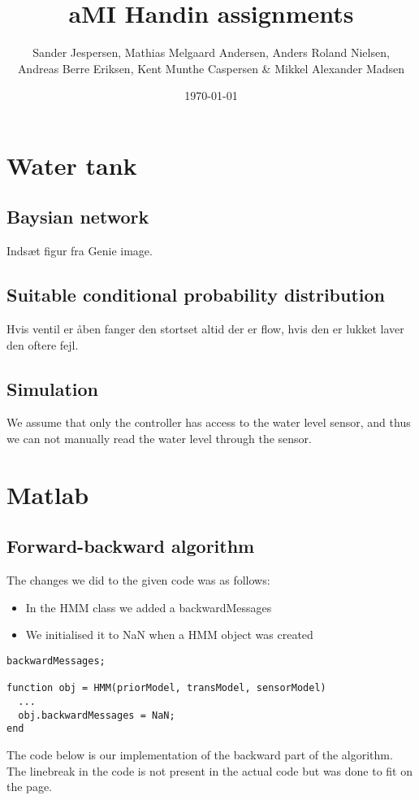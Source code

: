\documentclass[colorlinks=true,linkcolor=blue]{article}
\author{Sander Jespersen, Mathias Melgaard Andersen, Anders Roland Nielsen, \\ Andreas Berre Eriksen, Kent Munthe Caspersen \& Mikkel Alexander Madsen}
\date{\today}
\title{aMI Handin assignments}
\begin{document}
\maketitle

\section{Water tank}
\label{sec-1}
\subsection{Baysian network}
\label{sec-1-1}
Indsæt figur fra Genie image.

\subsection{Suitable conditional probability distribution}
\label{sec-1-2}
Hvis ventil er åben fanger den stortset altid der er flow, hvis den er lukket laver den oftere fejl.


\subsection{Simulation}
\label{sec-1-3}
We assume that only the controller has access to the water level sensor, and thus we can not manually read the water level through the sensor.

\section{Matlab}
\label{sec-2}
\subsection{Forward-backward algorithm}
\label{sec-2-1}
The changes we did to the given code was as follows:
\begin{itemize}
\item In the HMM class we added a backwardMessages
\item We initialised it to NaN when a HMM object was created
\end{itemize}
\begin{verbatim}
backwardMessages;

function obj = HMM(priorModel, transModel, sensorModel)
  ...
  obj.backwardMessages = NaN;
end
\end{verbatim}

The code below is our implementation of the backward part of the algorithm. The linebreak in the code is not present in the actual code but was done to fit on the page.
\end{document}
